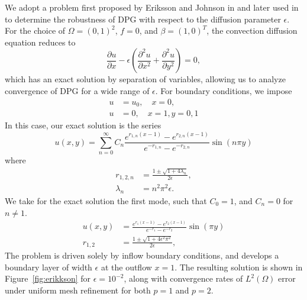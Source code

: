 \documentclass[final,leqno]{siamltex}
\newcommand{\LRp}[1]{\left( #1 \right)}
\renewcommand{\L}{L^2\LRp{\Omega}}
\newcommand{\pd}[2]{\frac{\partial#1}{\partial#2}}
\newcommand{\pdd}[2]{\frac{\partial^2#1}{\partial#2^2}}
\begin{document}
We adopt a problem first proposed by Eriksson and Johnson in \cite{Eriksson1993} and later used in \cite{DPGrobustness, DPGrobustness2} to determine the robustness of DPG with respect to the diffusion parameter $\epsilon$. For the choice of $\Omega = (0,1)^2$, $f=0$, and $\beta = (1,0)^T$, the convection diffusion equation reduces to
\[
\pd{u}{x} - \epsilon \left(\pdd{u}{x}+ \pdd{u}{y}\right) = 0,
\]
which has an exact solution by separation of variables, allowing us to analyze convergence of DPG for a wide range of $\epsilon$. For boundary conditions, we impose
\begin{align*}
u &= u_0, \quad x=0,\\
u &= 0, \quad x=1, y = 0,1
\end{align*}
In this case, our exact solution is the series
\[
u(x,y) = \sum_{n=0}^\infty C_n \frac{e^{r_{1,n}(x-1)} - e^{r_{2,n}(x-1)}}{e^{-r_{1,n}} - e^{-r_{2,n}}} \sin (n\pi y)
\]
where
\begin{align*}
r_{1,2,n} &= \frac{1 \pm \sqrt{1 + 4 \lambda_n}}{2 \epsilon},\\
\lambda_n &= n^2\pi^2 \epsilon.
\end{align*}
We take for the exact solution the first mode, such that $C_0 = 1$, and $C_n = 0$ for $n\neq 1$.  
\begin{align*}
u(x,y) &= \frac{e^{r_{1}(x-1)} - e^{r_{2}(x-1)}}{e^{-r_{1}} - e^{-r_{2}}} \sin (\pi y)\\
r_{1,2} &= \frac{1 \pm \sqrt{1 + 4 \epsilon^2 \pi^2}}{2 \epsilon},
\end{align*}
The problem is driven solely by inflow boundary conditions, and develops a boundary layer of width $\epsilon$ at the outflow $x = 1$.  The resulting solution is shown in Figure~\ref{fig:erikkson} for $\epsilon = 10^{-2}$, along with convergence rates of $\L$ error under uniform mesh refinement for both $p=1$ and $p=2$.  
\end{document}
